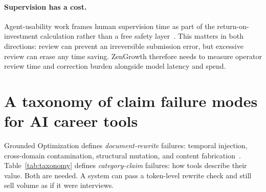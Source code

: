 \documentclass[11pt]{article}
\begin{document}
\paragraph{Supervision has a cost.} Agent-usability work frames human
supervision time as part of the return-on-investment calculation rather than a
free safety layer~\citep{liu2025agenticroi}. This matters in both directions:
review can prevent an irreversible submission error, but excessive review can
erase any time saving. ZenGrowth therefore needs to measure operator review
time and correction burden alongside model latency and spend.

\section{A taxonomy of claim failure modes for AI career tools}
\label{sec:taxonomy}

Grounded Optimization defines \emph{document-rewrite} failures: temporal
injection, cross-domain contamination, structural mutation, and content
fabrication~\citep{indukuri2026grounded}. Table~\ref{tab:taxonomy} defines
\emph{category-claim} failures: how tools describe their value. Both are
needed. A system can pass a token-level rewrite check and still sell volume as
if it were interviews.
\end{document}
